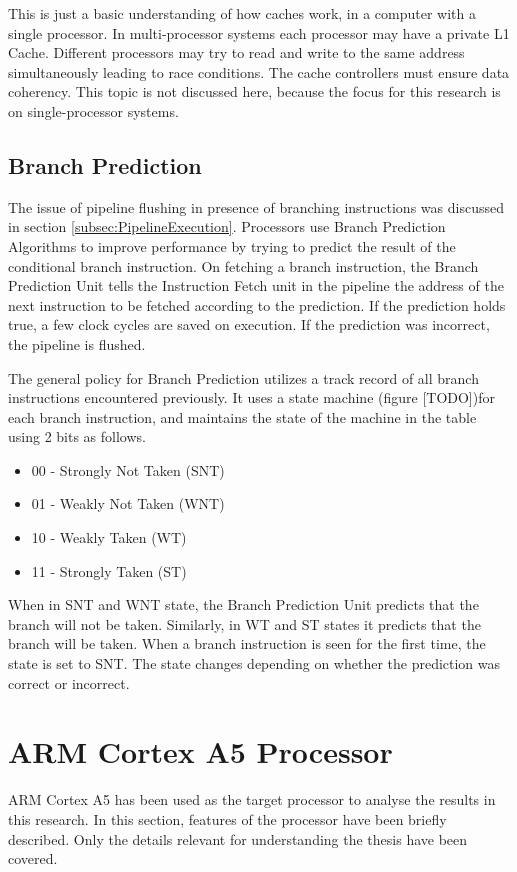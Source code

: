 This is just a basic understanding of how caches work, in a computer with a single processor. In multi-processor systems each processor may have a private L1 Cache. Different processors may try to read and write to the same address simultaneously leading to race conditions. The cache controllers must ensure data coherency. This topic is not discussed here, because the focus for this research is on single-processor systems.

\subsection{Branch Prediction}
\label{subsec:BranchPredition}
The issue of pipeline flushing in presence of branching instructions was discussed in section \ref{subsec:PipelineExecution}. Processors use Branch Prediction Algorithms to improve performance by trying to predict the result of the conditional branch instruction. On fetching a branch instruction, the Branch Prediction Unit tells the Instruction Fetch unit in the pipeline the address of the next instruction to be fetched according to the prediction. If the prediction holds true, a few clock cycles are saved on execution. If the prediction was incorrect, the pipeline is flushed. 

The general policy for Branch Prediction utilizes a track record of all branch instructions encountered previously. It uses a state machine (figure [TODO])for each branch instruction, and maintains the state of the machine in the table using 2 bits as follows.

\begin{itemize} \itemsep -6pt
\item 00 - Strongly Not Taken (SNT)
\item 01 - Weakly Not Taken (WNT)
\item 10 - Weakly Taken (WT)
\item 11 - Strongly Taken (ST)
\end{itemize}

When in SNT and WNT state, the Branch Prediction Unit predicts that the branch will not be taken. Similarly, in WT and ST states it predicts that the branch will be taken. When a branch instruction is seen for the first time, the state is set to SNT. The state changes depending on whether the prediction was correct or incorrect.

\section{ARM Cortex A5 Processor}
ARM Cortex A5 has been used as the target processor to analyse the results in this research. In this section, features of the processor have been briefly described. Only the details relevant for understanding the thesis have been covered. 

